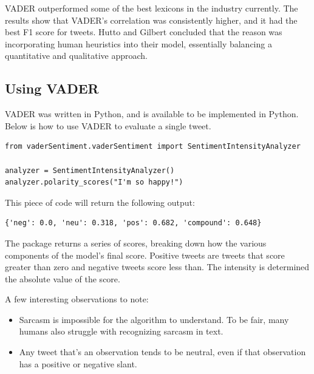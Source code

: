 \documentclass[11pt, twoside, reqno]{book}
\begin{document}
VADER outperformed some of the best lexicons in the industry currently. The results show that VADER's correlation was consistently higher, and it had the best F1 score for tweets. Hutto and Gilbert concluded that the reason was incorporating human heuristics into their model, essentially balancing a quantitative and qualitative approach. 

\subsection{Using VADER}
\hspace{0.2in}VADER was written in Python, and is available to be implemented in Python. Below is how to use VADER to evaluate a single tweet. 
\begin{verbatim}
from vaderSentiment.vaderSentiment import SentimentIntensityAnalyzer

analyzer = SentimentIntensityAnalyzer()
analyzer.polarity_scores("I'm so happy!")
\end{verbatim}
This piece of code will return the following output:
\begin{verbatim}
{'neg': 0.0, 'neu': 0.318, 'pos': 0.682, 'compound': 0.648}
\end{verbatim}
The package returns a series of scores, breaking down how the various components of the model's final score. Positive tweets are tweets that score greater than zero and negative tweets score less than. The intensity is determined the absolute value of the score. 

A few interesting observations to note:
\begin{itemize}
	\item Sarcasm is impossible for the algorithm to understand. To be fair, many humans also struggle with recognizing sarcasm in text.
	\item Any tweet that's an observation tends to be neutral, even if that observation has a positive or negative slant. 
\end{itemize}
\end{document}
